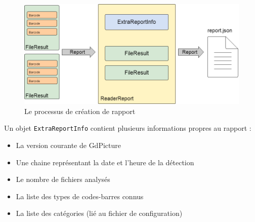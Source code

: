 \begin{figure}
\begin{center}
\includegraphics[scale=0.5]{images/projet1Rapport.png}
\caption{Le processus de création de rapport}
\end{center}
\end{figure}

Un objet \verb|ExtraReportInfo| contient plusieurs informations propres au rapport :
\begin{itemize}
\item La version courante de GdPicture
\item Une chaine représentant la date et l'heure de la détection
\item Le nombre de fichiers analysés
\item La liste des types de codes-barres connus
\item La liste des catégories (lié au fichier de configuration)
\end{itemize}